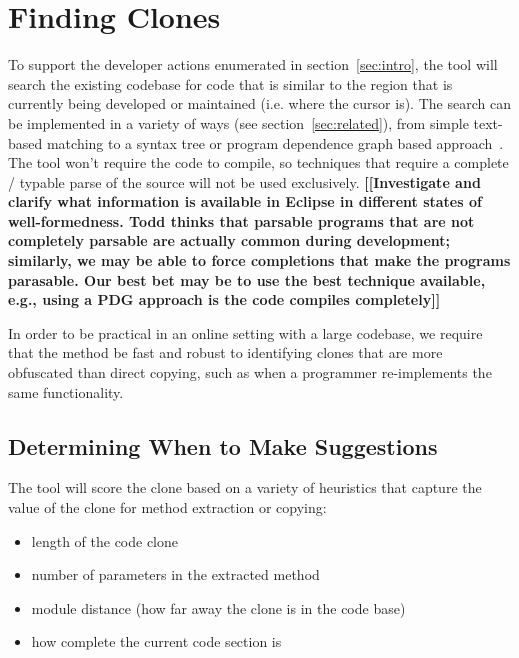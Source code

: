 \documentclass[preprint,10pt]{sigplanconf}
\newcommand{\todo}[1]{{\bfseries [[#1]]}}
\begin{document}
\section{Finding Clones}



To support the developer actions enumerated in section~\ref{sec:intro},
the tool will search the existing codebase for code
that is similar to the region that is currently being developed or maintained
(i.e. where the cursor is). The search can be implemented in a variety
of ways (see section~\ref{sec:related}), from simple text-based
matching to a syntax tree or program dependence graph based approach~\cite{LiE2011}. 
The tool won't require the
code to compile, so techniques that require a complete / typable parse
of the source will not be used exclusively. 
\todo{Investigate and clarify what information is available in Eclipse
  in different states of well-formedness. Todd thinks that parsable
  programs that are not completely parsable are actually common during
  development; similarly, we may be able to force completions that
  make the programs parasable. Our best bet may be to use the best
  technique available, e.g., using a PDG approach is the code compiles
  completely}

In order to be practical in an online
setting with a large codebase, we require that the method be fast and
robust to identifying clones that are more obfuscated than direct
copying, such as when a programmer re-implements the same
functionality.

\subsection{Determining When to Make Suggestions}
The tool will score the clone based on a variety of heuristics that
capture the value of the clone for method extraction or copying:

\begin{itemize}
  \item length of the code clone
  \item number of parameters in the extracted method
  \item module distance (how far away the clone is in the code base)
  \item how complete the current code section is
\end{itemize}
\end{document}
